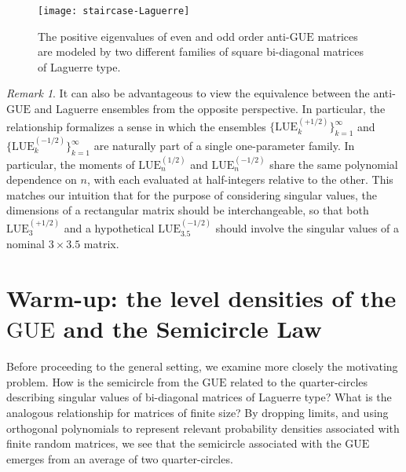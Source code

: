 \documentclass[pdftex, oneside, 10pt, letterpaper]{amsart}
\theoremstyle{plain}
\theoremstyle{definition}
\theoremstyle{remark}
\newtheorem*{rem}{Remark}
\begin{document}
\begin{figure}
\hspace*{\fill}\texttt{[image: staircase-Laguerre]}\hspace{\fill}\mbox{}
\caption{The positive eigenvalues of even and odd order anti-{\ensuremath{\mathrm{GUE}}}{}
  matrices are modeled by two different families of square bi-diagonal
  matrices of Laguerre type.}\label{fig:staircase-Laguerre}
\end{figure}

\begin{rem}
  It can also be advantageous to view the equivalence between the
  anti-{\ensuremath{\mathrm{GUE}}}{} and Laguerre ensembles from the opposite perspective.
  In particular, the relationship formalizes a sense in which the
  ensembles $\{{\ensuremath{\mathrm{LUE}}}_{k}^{(+1/2)}\}_{k=1}^{\infty}$ and
  $\{{\ensuremath{\mathrm{LUE}}}_{k}^{(-1/2)}\}_{k=1}^{\infty}$ are naturally part of a
  single one-parameter family.  In particular, the moments of
  ${\ensuremath{\mathrm{LUE}}}_n^{(1/2)}$ and ${\ensuremath{\mathrm{LUE}}}_n^{(-1/2)}$ share the same polynomial
  dependence on $n$, with each evaluated at half-integers relative to
  the other.  This matches our intuition that for the purpose of
  considering singular values, the dimensions of a rectangular matrix
  should be interchangeable, so that both ${\ensuremath{\mathrm{LUE}}}_{3}^{(+1/2)}$ and a
  hypothetical ${\ensuremath{\mathrm{LUE}}}_{3.5}^{(-1/2)}$ should involve the singular
  values of a nominal $3\times3.5$ matrix.
\end{rem}

\goodbreak

\section{Warm-up:  the level densities of the {\ensuremath{\mathrm{GUE}}}{} and the
  Semicircle Law}\label{sec:leveldensities}

Before proceeding to the general setting, we examine more closely the
motivating problem.  How is the semicircle from the {\ensuremath{\mathrm{GUE}}}{} related to
the quarter-circles describing singular values of bi-diagonal matrices
of Laguerre type?  What is the analogous relationship for matrices of
finite size?
By dropping limits, and using orthogonal polynomials to represent
relevant probability densities associated with finite random matrices,
we see that the semicircle associated with the {\ensuremath{\mathrm{GUE}}}{} emerges from an
average of two quarter-circles.
\end{document}
